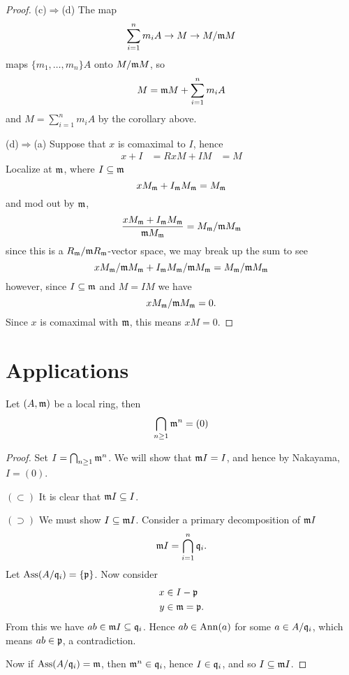 \documentclass{ximera}
\begin{document}
\begin{theorem}
\begin{proof}
    
    (c)$\Rightarrow$(d) The map
    \[
    \sum_{i=1}^n m_iA \to M \to M/\mathfrak{m} M
    \]
    maps $\{m_1,\dots, m_n\}A$ onto $M/\mathfrak{m} M$, so
    \[
    M = \mathfrak{m} M + \sum_{i=1}^n m_iA 
    \]
    and $M = \sum_{i=1}^n m_iA$ by the corollary above.

    
    (d)$\Rightarrow$(a) Suppose that $x$ is comaximal to $I$, hence
    \begin{align*}
      x + I &= R
      xM + IM &= M
    \end{align*}
    Localize at $\mathfrak{m}$, where $I\subseteq\mathfrak{m}$
    \[
    xM_{\mathfrak{m}} + I_{\mathfrak{m}} M_{\mathfrak{m}} = M_{\mathfrak{m}}
    \]
    and mod out by $\mathfrak{m}$,
    \[
    \frac{xM_{\mathfrak{m}} + I_{\mathfrak{m}} M_{\mathfrak{m}}}{\mathfrak{m} M_{\mathfrak{m}}} = M_{\mathfrak{m}}/\mathfrak{m} M_{\mathfrak{m}}
    \]
    since this is a $R_{\mathfrak{m}}/\mathfrak{m} R_{\mathfrak{m}}$-vector space, we may break up the sum to see
    \[
    xM_{\mathfrak{m}}/\mathfrak{m} M_{\mathfrak{m}} + I_{\mathfrak{m}} M_{\mathfrak{m}}/\mathfrak{m} M_{\mathfrak{m}} = M_{\mathfrak{m}}/\mathfrak{m} M_{\mathfrak{m}}
    \]
    however, since $I\subseteq\mathfrak{m}$ and $M = IM$ we have
    \[
    xM_{\mathfrak{m}}/\mathfrak{m} M_{\mathfrak{m}} =0.
    \]
    Since $x$ is comaximal with $\mathfrak{m}$, this means $xM = 0$.
  \end{proof}
\end{theorem}


\section{Applications}

\begin{corollary}
  Let $(A,\mathfrak{m})$ be a local ring, then
  \[
  \bigcap_{n\ge 1} \mathfrak{m}^n  = (0)
  \]
  \begin{proof}
    Set $I = \bigcap_{n\ge 1} \mathfrak{m}^n$. We will show that $\mathfrak{m} I = I$, and
    hence by Nakayama, $I = (0)$.

    $(\subset)$ It is clear that $\mathfrak{m} I \subseteq I$.

    $(\supset)$ We must show $I\subseteq \mathfrak{m} I$. Consider a primary
    decomposition of $\mathfrak{m} I$
    \[
    \mathfrak{m} I = \bigcap_{i=1}^n \mathfrak{q}_i.
    \]
    Let $\operatorname{Ass}(A/\mathfrak{q}_i) = \{\mathfrak{p}\}$. Now consider
    \begin{align*}
      x &\in I -\mathfrak{p}\\
      y &\in \mathfrak{m} = \mathfrak{p}.
    \end{align*}
    From this we have $ab\in\mathfrak{m} I \subseteq \mathfrak{q}_i$. Hence $ab\in\operatorname{Ann}(a)$
    for some $a\in A/\mathfrak{q}_i$, which means $ab\in \mathfrak{p}$, a contradiction.

    Now if $\operatorname{Ass}(A/\mathfrak{q}_i) = \mathfrak{m}$, then $\mathfrak{m}^n\in\mathfrak{q}_i$, hence $I\in\mathfrak{q}_i$,
    and so $I\subseteq \mathfrak{m} I$.
  \end{proof}
\end{corollary}
\end{document}
